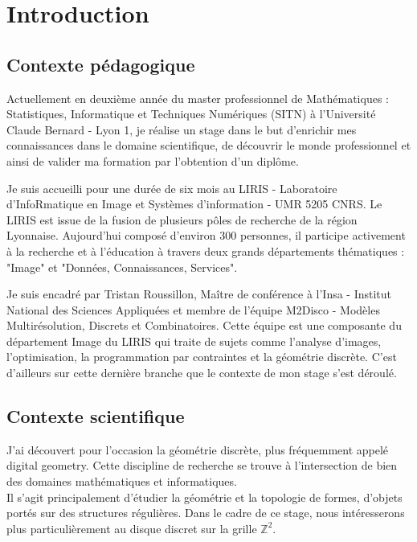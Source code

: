 \section{Introduction}

\subsection{Contexte pédagogique}

Actuellement en deuxième année du master professionnel de Mathématiques : Statistiques, Informatique et Techniques Numériques (SITN) à l’Université Claude Bernard - Lyon 1, je réalise un stage dans le but d'enrichir mes connaissances dans le domaine scientifique, de découvrir le monde professionnel et ainsi de valider ma formation par l'obtention d'un diplôme.\newline

Je suis accueilli pour une durée de six mois au LIRIS - Laboratoire d'InfoRmatique en Image et Systèmes d'information - UMR 5205 CNRS. Le LIRIS est issue de la fusion de plusieurs pôles de recherche de la région Lyonnaise. Aujourd'hui composé d'environ 300 personnes, il participe activement à la recherche et à l'éducation à travers deux grands départements thématiques : "Image" et "Données, Connaissances, Services".\newline

Je suis encadré par Tristan Roussillon, Maître de conférence à l'Insa - Institut National des Sciences Appliquées et membre de l'équipe M2Disco - Modèles Multirésolution, Discrets et Combinatoires. Cette équipe est une composante du département Image du LIRIS qui traite de sujets comme l'analyse d'images, l'optimisation, la programmation par contraintes et la géométrie discrète. C'est d'ailleurs sur cette dernière branche que le contexte de mon stage s'est déroulé.

\subsection{Contexte scientifique}

J'ai découvert pour l’occasion la géométrie discrète, plus fréquemment appelé digital geometry. Cette discipline de recherche se trouve à l'intersection de bien des domaines mathématiques et informatiques.\\
 
Il s'agit principalement d'étudier la géométrie et la topologie de formes, d'objets portés sur des structures régulières. Dans le cadre de ce stage, nous intéresserons plus particulièrement au disque discret sur la grille $\mathbb{Z}^{2}$. 
